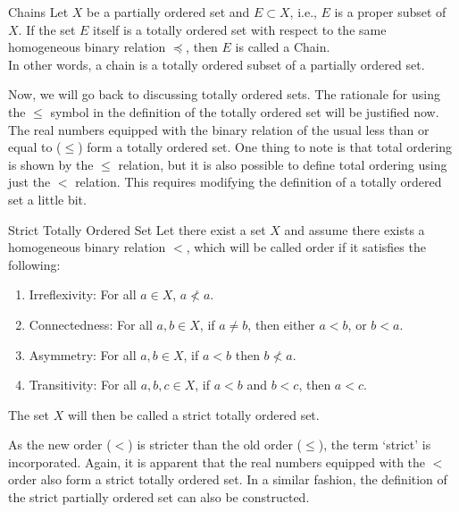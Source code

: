 \begin{Definition}{Chains}\label{chains}
    Let $X$ be a partially ordered set and $E\subset X$, i.e., $E$ is a proper subset of $X$. If the set $E$ itself is a totally ordered set with respect to the same homogeneous binary relation $\preceq$, then $E$ is called a Chain.\\ In other words, a chain is a totally ordered subset of a partially ordered set.
\end{Definition}
\noindent Now, we will go back to discussing totally ordered sets. The rationale for using the $\leq$ symbol in the definition of the totally ordered set will be justified now. The real numbers equipped with the binary relation of the usual less than or equal to ($\leq$) form a totally ordered set.\smallskip \newline
\noindent One thing to note is that total ordering is shown by the $\leq$ relation, but it is also possible to define total ordering using just the $<$ relation. This requires modifying the definition of a totally ordered set a little bit.
\begin{Definition}{Strict Totally Ordered Set}\label{strict_totally_ordered_set}
    Let there exist a set $X$ and assume there exists a homogeneous binary relation $<$, which will be called order if it satisfies the following:
    \begin{enumerate}
        \item Irreflexivity: For all $a\in X$, $a\nless a$.
        \item Connectedness: For all $a,b\in X$, if $a\neq b$, then either $a< b$, or $b< a$.
        \item Asymmetry\footnotemark: For all $a,b\in X$, if $a< b$ then $b\nless a$.
        \item Transitivity: For all $a,b,c\in X$, if $a< b$ and $b< c$, then $a< c$.
    \end{enumerate}
    The set $X$ will then be called a strict totally ordered set.
\end{Definition}
\noindent As the new order ($<$) is stricter than the old order ($\leq$), the term `strict' is incorporated. Again, it is apparent that the real numbers equipped with the $<$ order also form a strict totally ordered set. In a similar fashion, the definition of the strict partially ordered set can also be constructed.
